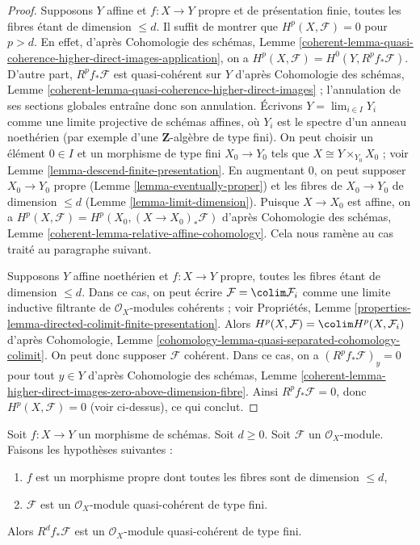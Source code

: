 \begin{proof}
\medskip\noindent
Supposons $Y$ affine et $f : X \to Y$ propre et de présentation finie,
toutes les fibres étant de dimension $\leq d$. Il suffit de montrer que
$H^p(X, \mathcal{F}) = 0$ pour $p > d$. En effet, d'après
Cohomologie des schémas, Lemme
\ref{coherent-lemma-quasi-coherence-higher-direct-images-application},
on a $H^p(X, \mathcal{F}) = H^0(Y, R^pf_*\mathcal{F})$.
D'autre part, $R^pf_*\mathcal{F}$ est quasi-cohérent sur $Y$
d'après Cohomologie des schémas, Lemme
\ref{coherent-lemma-quasi-coherence-higher-direct-images} ;
l'annulation de ses sections globales entraîne donc son annulation.
Écrivons $Y = \lim_{i \in I} Y_i$ comme une limite projective de schémas affines,
où $Y_i$ est le spectre d'un anneau noethérien
(par exemple d'une $\mathbf{Z}$-algèbre de type fini).
On peut choisir un élément $0 \in I$ et un morphisme de type fini
$X_0 \to Y_0$ tels que $X \cong Y \times_{Y_0} X_0$ ; voir
Lemme \ref{lemma-descend-finite-presentation}.
En augmentant $0$, on peut supposer $X_0 \to Y_0$ propre
(Lemme \ref{lemma-eventually-proper})
et les fibres de $X_0 \to Y_0$ de dimension $\leq d$
(Lemme \ref{lemma-limit-dimension}).
Puisque $X \to X_0$ est affine, on a
$H^p(X, \mathcal{F}) = H^p(X_0, (X \to X_0)_*\mathcal{F})$ d'après
Cohomologie des schémas, Lemme \ref{coherent-lemma-relative-affine-cohomology}.
Cela nous ramène au cas traité au paragraphe suivant.

\medskip\noindent
Supposons $Y$ affine noethérien et $f : X \to Y$ propre,
toutes les fibres étant de dimension $\leq d$.
Dans ce cas, on peut écrire $\mathcal{F} = \colim \mathcal{F}_i$
comme une limite inductive filtrante de $\mathcal{O}_X$-modules cohérents ; voir
Propriétés, Lemme
\ref{properties-lemma-directed-colimit-finite-presentation}.
Alors $H^p(X, \mathcal{F}) = \colim H^p(X, \mathcal{F}_i)$ d'après
Cohomologie, Lemme \ref{cohomology-lemma-quasi-separated-cohomology-colimit}.
On peut donc supposer $\mathcal{F}$ cohérent.
Dans ce cas, on a $(R^pf_*\mathcal{F})_y = 0$ pour
tout $y \in Y$ d'après Cohomologie des schémas, Lemme
\ref{coherent-lemma-higher-direct-images-zero-above-dimension-fibre}.
Ainsi $R^pf_*\mathcal{F} = 0$, donc
$H^p(X, \mathcal{F}) = 0$ (voir ci-dessus), ce qui conclut.
\end{proof}

\begin{lemma}
\label{lemma-proper-top-cohomology-finite-type}
Soit $f : X \to Y$ un morphisme de schémas. Soit $d \geq 0$. Soit $\mathcal{F}$
un $\mathcal{O}_X$-module. Faisons les hypothèses suivantes :
\begin{enumerate}
\item $f$ est un morphisme propre dont toutes les fibres sont de dimension $\leq d$,
\item $\mathcal{F}$ est un $\mathcal{O}_X$-module quasi-cohérent de type fini.
\end{enumerate}
Alors $R^df_*\mathcal{F}$ est un $\mathcal{O}_X$-module quasi-cohérent
de type fini.
\end{lemma}

